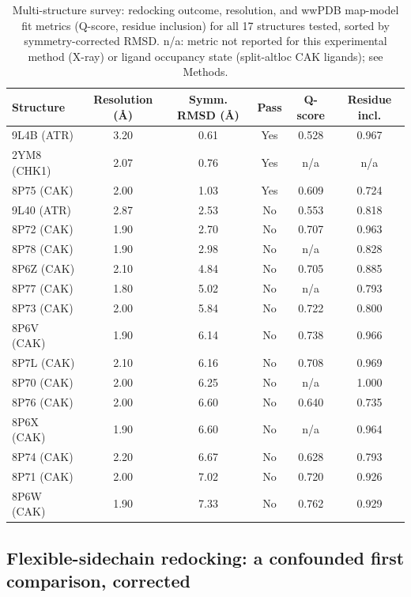 \documentclass[11pt]{article}
\begin{document}
\begin{table}[htbp]
\centering
\caption{Multi-structure survey: redocking outcome, resolution, and wwPDB map-model fit metrics (Q-score, residue inclusion) for all 17 structures tested, sorted by symmetry-corrected RMSD. n/a: metric not reported for this experimental method (X-ray) or ligand occupancy state (split-altloc CAK ligands); see Methods.}
\label{tab:survey}
\small
\begin{tabular}{lccccc}
\toprule
Structure & Resolution ({\AA}) & Symm. RMSD ({\AA}) & Pass & Q-score & Residue incl. \\
\midrule
9L4B (ATR)  & 3.20 & 0.61 & Yes & 0.528 & 0.967 \\
2YM8 (CHK1) & 2.07 & 0.76 & Yes & n/a   & n/a \\
8P75 (CAK)  & 2.00 & 1.03 & Yes & 0.609 & 0.724 \\
9L40 (ATR)  & 2.87 & 2.53 & No  & 0.553 & 0.818 \\
8P72 (CAK)  & 1.90 & 2.70 & No  & 0.707 & 0.963 \\
8P78 (CAK)  & 1.90 & 2.98 & No  & n/a   & 0.828 \\
8P6Z (CAK)  & 2.10 & 4.84 & No  & 0.705 & 0.885 \\
8P77 (CAK)  & 1.80 & 5.02 & No  & n/a   & 0.793 \\
8P73 (CAK)  & 2.00 & 5.84 & No  & 0.722 & 0.800 \\
8P6V (CAK)  & 1.90 & 6.14 & No  & 0.738 & 0.966 \\
8P7L (CAK)  & 2.10 & 6.16 & No  & 0.708 & 0.969 \\
8P70 (CAK)  & 2.00 & 6.25 & No  & n/a   & 1.000 \\
8P76 (CAK)  & 2.00 & 6.60 & No  & 0.640 & 0.735 \\
8P6X (CAK)  & 1.90 & 6.60 & No  & n/a   & 0.964 \\
8P74 (CAK)  & 2.20 & 6.67 & No  & 0.628 & 0.793 \\
8P71 (CAK)  & 2.00 & 7.02 & No  & 0.720 & 0.926 \\
8P6W (CAK)  & 1.90 & 7.33 & No  & 0.762 & 0.929 \\
\bottomrule
\end{tabular}
\end{table}

\subsection*{Flexible-sidechain redocking: a confounded first comparison,
corrected}
\end{document}
